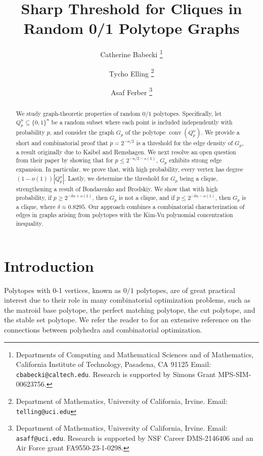 \documentclass[11pt]{article}
\def\conv{\operatorname {conv}}
\theoremstyle{definition}
\theoremstyle{plain}
\begin{document}
\title{Sharp Threshold for Cliques in Random 0/1 Polytope Graphs}


\author{Catherine Babecki \thanks{Departments of Computing and Mathematical Sciences and of Mathematics, California
Institute of Technology, Pasadena, CA 91125 
Email:  {{\tt cbabecki@caltech.edu}}. Research is supported by  Simons Grant MPS-SIM-00623756.
}  \and Tycho Elling \thanks{Department of Mathematics, University of California, Irvine. Email: {\tt telling@uci.edu}}\and Asaf Ferber \thanks{Department of Mathematics, University of California, Irvine. 
Email:  {{\tt asaff@uci.edu}}. Research is supported by NSF Career DMS-2146406 and an Air Force grant FA9550-23-1-0298.} }

\maketitle

\begin{abstract}
    We study graph-theoretic properties of random $0/1$ polytopes. Specifically, let $Q_p^n \subseteq \{0,1\}^n$ be a random subset where each point is included independently with probability $p$, and consider the graph $G_p$ of the polytope $\conv(Q_p^n)$.
We provide a short and combinatorial proof that $p = 2^{-n/2}$ is a threshold for the edge density of $G_p$, a result originally due to Kaibel and Remshagen. 
We next resolve an open question from their paper by showing that for $p \leq 2^{-n/2 - o(1)}$, $G_p$ exhibits strong edge expansion.
In particular, we prove that, with high probability, every vertex has degree $(1 - o(1))|Q_p^n|$. 
Lastly, we determine the threshold for $G_p$ being a clique, strengthening a result of Bondarenko and Brodskiy. 
We show that with high probability, if
\( p \geq  2^{-\delta n + o(1)} \), then $G_p$ is not a clique, and if \( p \leq 2^{-\delta n - o(1)}\), then \(G_p\) is a clique, where \(\delta \approx 0.8295\).
Our approach combines a combinatorial characterization of edges in graphs arising from polytopes with the Kim-Vu polynomial concentration inequality.
\end{abstract}




\section{Introduction}

Polytopes with 0-1 vertices, known as $0/1$ polytopes, are of great practical interest due to their role in many combinatorial optimization problems, such as the matroid base polytope, the perfect matching polytope, the cut polytope, and the stable set polytope.
We refer the reader to \cite{SchrijverBooks} for an extensive reference on the connections between polyhedra and combinatorial optimization.
\end{document}
